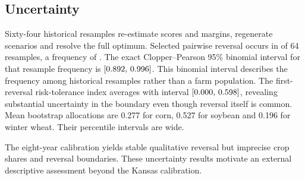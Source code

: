 \subsection{Uncertainty}

Sixty-four historical resamples re-estimate scores and margins, regenerate
scenarios and resolve the full optimum. Selected pairwise reversal occurs in
\BootstrapReversalCount{} of 64 resamples, a frequency of
\BootstrapProbability. The exact Clopper--Pearson 95\% binomial interval for
that resample frequency is
\([0.892,\,0.996]\). This binomial
interval describes the frequency among historical resamples rather than a
farm population. The first-reversal
risk-tolerance index averages \BootstrapFirstMean{} with interval
\([0.000,\,0.598]\), revealing substantial
uncertainty in the boundary even though reversal itself is common. Mean
bootstrap allocations are 0.277 for corn, 0.527 for soybean and 0.196 for
winter wheat. Their percentile intervals are wide.

The eight-year calibration yields stable qualitative reversal but imprecise
crop shares and reversal boundaries. These uncertainty results motivate an
external descriptive assessment beyond the Kansas calibration.

